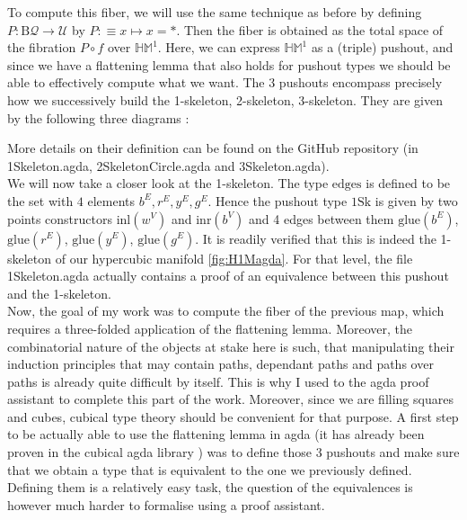 \documentclass{report}
\begin{document}
To compute this fiber, we will use the same technique as before by defining $P : \mathrm{B} \mathcal Q \rightarrow \mathcal U$ by $P :\equiv x \mapsto x=*$. Then the fiber is obtained as the total space of the fibration $P \circ f $ over $\mathbb{HM}^1$. Here, we can express $\mathbb{HM}^1$ as a (triple) pushout, and since we have a flattening lemma that also holds for pushout types we should be able to effectively compute what we want. The 3 pushouts encompass precisely how we successively build the 1-skeleton, 2-skeleton, 3-skeleton. They are given by the following three diagrams : 
\begin{center}
\end{center}
More details on their definition can be found on the GitHub repository \cite{repo} (in 1Skeleton.agda, 2SkeletonCircle.agda and 3Skeleton.agda). \\
We will now take a closer look at the 1-skeleton. The type $\mathrm{edges}$ is defined to be the set with $4$ elements $b^E,r^E,y^E,g^E$. Hence the pushout type $1\mathrm{Sk}$ is given by two points constructors $\mathrm{inl}(w^V)$ and $\mathrm{inr}(b^V)$ and 4 edges between them $\mathrm{glue}(b^E)$, $\mathrm{glue}(r^E)$, $\mathrm{glue}(y^E)$, $\mathrm{glue}(g^E)$. It is readily verified that this is indeed the 1-skeleton of our hypercubic manifold \ref{fig:H1Magda}. For that level, the file 1Skeleton.agda actually contains a proof of an equivalence between this pushout and the 1-skeleton. \\
Now, the goal of my work was to compute the fiber of the previous map, which requires a three-folded application of the flattening lemma. Moreover, the combinatorial nature of the objects at stake here is such, that manipulating their induction principles that may contain paths, dependant paths and paths over paths is already quite difficult by itself. This is why I used to the agda proof assistant to complete this part of the work. Moreover, since we are filling squares and cubes, cubical type theory should be convenient for that purpose. A first step to be actually able to use the flattening lemma in agda (it has already been proven in the cubical agda library \cite{cubicalagda}) was to define those 3 pushouts and make sure that we obtain a type that is equivalent to the one we previously defined. Defining them is a relatively easy task, the question of the equivalences is however much harder to formalise using a proof assistant. \\
\end{document}
